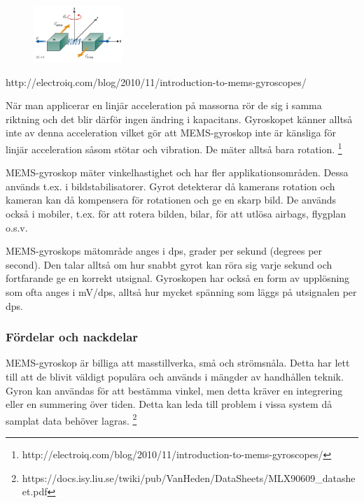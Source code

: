\documentclass[a4paper,12pt,fleqn]{article}
\begin{document}
\begin{figure}[h]
\label{fig:angular}
\caption{}
\includegraphics[width=0.3\textwidth]
{angularv.png}
\end{figure}
http://electroiq.com/blog/2010/11/introduction-to-mems-gyroscopes/

När man applicerar en linjär acceleration på massorna rör de sig i samma riktning och det blir därför ingen ändring i kapacitans. Gyroskopet känner alltså inte av denna acceleration vilket gör att MEMS-gyroskop inte är känsliga för linjär acceleration såsom stötar och vibration. De mäter alltså bara rotation.
\footnote{http://electroiq.com/blog/2010/11/introduction-to-mems-gyroscopes/}


MEMS-gyroskop mäter vinkelhastighet och har fler applikationsområden. Dessa används t.ex. i bildstabilisatorer. Gyrot detekterar då kamerans rotation och kameran kan då kompensera för rotationen och ge en skarp bild. De används också i mobiler, t.ex. för att rotera bilden, bilar, för att utlösa airbags, flygplan o.s.v.

MEMS-gyroskops mätområde anges i dps, grader per sekund (degrees per second). Den talar alltså om hur snabbt gyrot kan röra sig varje sekund och fortfarande ge en korrekt utsignal. Gyroskopen har också en form av upplösning som ofta anges i mV/dps, alltså hur mycket spänning som läggs på utsignalen per dps.

\subsubsection{Fördelar och nackdelar}
MEMS-gyroskop är billiga att masstillverka, små och strömsnåla. Detta har lett till att de blivit väldigt populära och används i mängder av handhållen teknik.
Gyron kan användas för att bestämma vinkel, men detta kräver en integrering eller en summering över tiden. Detta kan leda till problem i vissa system då samplat data behöver lagras.
\footnote{https://docs.isy.liu.se/twiki/pub/VanHeden/DataSheets/MLX90609_datasheet.pdf}
\end{document}
